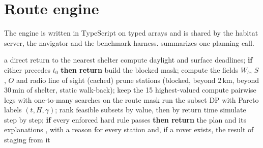 \section{Route engine}
\label{sec:engine}

The engine is written in TypeScript on typed arrays and is shared by the habitat server, the navigator and the benchmark harness.  summarizes one planning call.

\begin{algorithm*}[t]
\caption{One planning call. Every returned plan has passed the simulator; otherwise the result is \stayin.}
\label{alg:plan}
\small
\begin{algorithmic}[1]
 \Return a direct return to the nearest shelter \EndIf
\State compute daylight and surface deadlines; \textbf{if} either precedes $t_0$ \textbf{then return} \stayin
\State build the blocked mask; compute the fields $W_b$, $S$, $O$ and radio line of sight (cached) 
\State prune stations (blocked, beyond 2\,km, beyond 30\,min of shelter, static walk-back); keep the 15 highest-valued
\State compute pairwise legs with one-to-many searches on the route mask
\State run the subset DP with Pareto labels $(t,H,\gamma)$; rank feasible subsets by value, then by return time 
  \State simulate step by step; \textbf{if} every enforced hard rule passes \textbf{then return} the plan and its explanations
\EndFor
\State \Return \stayin, with a reason for every station and, if a rover exists, the result of staging from it
\end{algorithmic}
\end{algorithm*}

